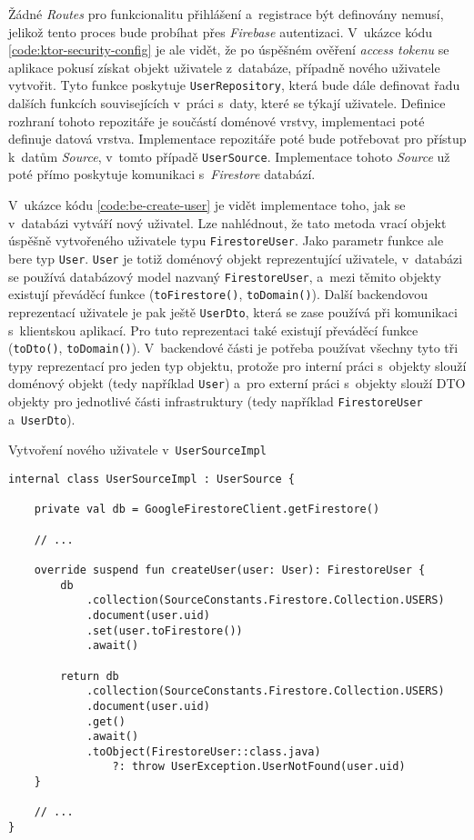 Žádné \emph{Routes} pro funkcionalitu přihlášení a~registrace být definovány nemusí, jelikož tento proces bude probíhat přes \emph{Firebase} autentizaci. V~ukázce kódu \ref{code:ktor-security-config} je ale vidět, že po úspěšném ověření \emph{access tokenu} se aplikace pokusí získat objekt uživatele z~databáze, případně nového uživatele vytvořit. Tyto funkce poskytuje \texttt{UserRepository}, která bude dále definovat řadu dalších funkcích souvisejících v~práci s~daty, které se týkají uživatele. Definice rozhraní tohoto repozitáře je součástí doménové vrstvy, implementaci poté definuje datová vrstva. Implementace repozitáře poté bude potřebovat pro přístup k~datům \emph{Source}, v~tomto případě \texttt{UserSource}. Implementace tohoto \emph{Source} už poté přímo poskytuje komunikaci s~\emph{Firestore} databází.

V~ukázce kódu \ref{code:be-create-user} je vidět implementace toho, jak se v~databázi vytváří nový uživatel. Lze nahlédnout, že tato metoda vrací objekt úspěšně vytvořeného uživatele typu \texttt{FirestoreUser}. Jako parametr funkce ale bere typ \texttt{User}. \texttt{User} je totiž doménový objekt reprezentující uživatele, v~databázi se používá databázový model nazvaný \texttt{FirestoreUser}, a~mezi těmito objekty existují převáděcí funkce (\texttt{toFirestore()}, \texttt{toDomain()}). Další backendovou reprezentací uživatele je pak ještě \texttt{UserDto}, která se zase používá při komunikaci s~klientskou aplikací. Pro tuto reprezentaci také existují převáděcí funkce (\texttt{toDto()}, \texttt{toDomain()}). V~backendové části je potřeba používat všechny tyto tři typy reprezentací pro jeden typ objektu, protože pro interní práci s~objekty slouží doménový objekt (tedy například \texttt{User}) a~pro externí práci s~objekty slouží DTO objekty pro jednotlivé části infrastruktury (tedy například \texttt{FirestoreUser} a~\texttt{UserDto}).

\begin{listing}
\caption{Vytvoření nového uživatele v~\texttt{UserSourceImpl}}\label{code:be-create-user}
\begin{verbatim}
internal class UserSourceImpl : UserSource {

    private val db = GoogleFirestoreClient.getFirestore()
    
    // ...
    
    override suspend fun createUser(user: User): FirestoreUser {
        db
            .collection(SourceConstants.Firestore.Collection.USERS)
            .document(user.uid)
            .set(user.toFirestore())
            .await()

        return db
            .collection(SourceConstants.Firestore.Collection.USERS)
            .document(user.uid)
            .get()
            .await()
            .toObject(FirestoreUser::class.java) 
                ?: throw UserException.UserNotFound(user.uid)
    }
    
    // ...
}
\end{verbatim}
\end{listing}

